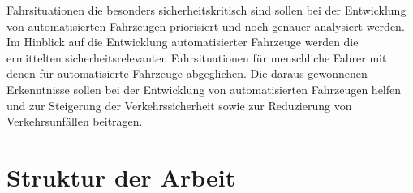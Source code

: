 Fahrsituationen die besonders sicherheitskritisch sind sollen bei der Entwicklung von automatisierten Fahrzeugen priorisiert und noch genauer analysiert werden. Im Hinblick auf die Entwicklung automatisierter Fahrzeuge werden die ermittelten sicherheitsrelevanten Fahrsituationen für menschliche Fahrer mit denen für automatisierte Fahrzeuge abgeglichen. Die daraus gewonnenen Erkenntnisse sollen bei der Entwicklung von automatisierten Fahrzeugen helfen und zur Steigerung der Verkehrssicherheit sowie zur Reduzierung von Verkehrsunfällen beitragen. 

\section{Struktur der Arbeit}
